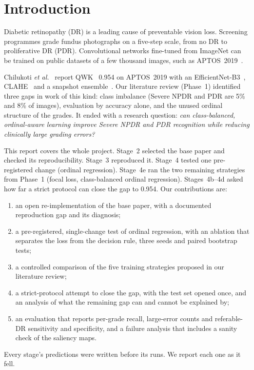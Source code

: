 \documentclass[conference]{IEEEtran}
\begin{document}
\section{Introduction}
Diabetic retinopathy (DR) is a leading cause of preventable vision loss. Screening programmes grade fundus
photographs on a five-step scale, from no DR to proliferative DR (PDR). Convolutional networks fine-tuned from
ImageNet can be trained on public datasets of a few thousand images, such as APTOS~2019~\cite{aptos2019}.

Chilukoti \emph{et al.}~\cite{chilukoti2024} report QWK~\cite{cohen1968kappa} 0.954 on APTOS~2019 with an
EfficientNet-B3~\cite{tan2019efficientnet}, CLAHE~\cite{zuiderveld1994clahe} and a snapshot
ensemble~\cite{huang2017snapshot}. Our literature review (Phase~1) identified three gaps in work of this kind:
class imbalance (Severe NPDR and PDR are 5\% and 8\% of images), evaluation by accuracy alone, and the unused ordinal
structure of the grades. It ended with a research question: \emph{can class-balanced, ordinal-aware learning
improve Severe NPDR and PDR recognition while reducing clinically large grading errors?}

This report covers the whole project. Stage~2 selected the base paper and checked its reproducibility. Stage~3
reproduced it. Stage~4 tested one pre-registered change (ordinal regression). Stage~4e ran the two remaining
strategies from Phase~1 (focal loss, class-balanced ordinal regression). Stages~4b--4d asked how far a strict
protocol can close the gap to 0.954. Our contributions are:
\begin{enumerate}
\item an open re-implementation of the base paper, with a documented reproduction gap and its diagnosis;
\item a pre-registered, single-change test of ordinal regression, with an ablation that separates the loss from the
decision rule, three seeds and paired bootstrap tests;
\item a controlled comparison of the five training strategies proposed in our literature review;
\item a strict-protocol attempt to close the gap, with the test set opened once, and an analysis of what the
remaining gap can and cannot be explained by;
\item an evaluation that reports per-grade recall, large-error counts and referable-DR sensitivity and specificity,
and a failure analysis that includes a sanity check of the saliency maps.
\end{enumerate}
Every stage's predictions were written before its runs. We report each one as it fell.
\end{document}
